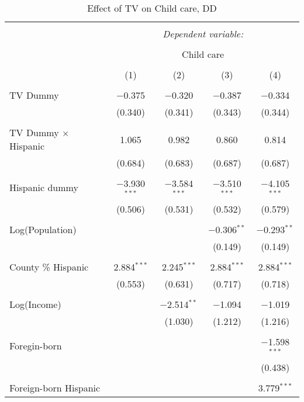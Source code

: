 
\begin{table}[!htbp] \centering 
  \caption{Effect of TV on Child care, DD} 
  \label{} 
\begin{tabular}{@{\extracolsep{-5pt}}lcccc} 
\\[-1.8ex]\hline 
\hline \\[-1.8ex] 
 & \multicolumn{4}{c}{\textit{Dependent variable:}} \\ 
\cline{2-5} 
\\[-1.8ex] & \multicolumn{4}{c}{Child care} \\ 
\\[-1.8ex] & (1) & (2) & (3) & (4)\\ 
\hline \\[-1.8ex] 
 TV Dummy & $-$0.375 & $-$0.320 & $-$0.387 & $-$0.334 \\ 
  & (0.340) & (0.341) & (0.343) & (0.344) \\ 
  & & & & \\ 
 TV Dummy $\times$ Hispanic  & 1.065 & 0.982 & 0.860 & 0.814 \\ 
  & (0.684) & (0.683) & (0.687) & (0.687) \\ 
  & & & & \\ 
 Hispanic dummy & $-$3.930$^{***}$ & $-$3.584$^{***}$ & $-$3.510$^{***}$ & $-$4.105$^{***}$ \\ 
  & (0.506) & (0.531) & (0.532) & (0.579) \\ 
  & & & & \\ 
 Log(Population) &  &  & $-$0.306$^{**}$ & $-$0.293$^{**}$ \\ 
  &  &  & (0.149) & (0.149) \\ 
  & & & & \\ 
 County \% Hispanic & 2.884$^{***}$ & 2.245$^{***}$ & 2.884$^{***}$ & 2.884$^{***}$ \\ 
  & (0.553) & (0.631) & (0.717) & (0.718) \\ 
  & & & & \\ 
 Log(Income) &  & $-$2.514$^{**}$ & $-$1.094 & $-$1.019 \\ 
  &  & (1.030) & (1.212) & (1.216) \\ 
  & & & & \\ 
 Foregin-born &  &  &  & $-$1.598$^{***}$ \\ 
  &  &  &  & (0.438) \\ 
  & & & & \\ 
 Foreign-born Hispanic &  &  &  & 3.779$^{***}$ \\ 

\end{tabular}
\end{table}
